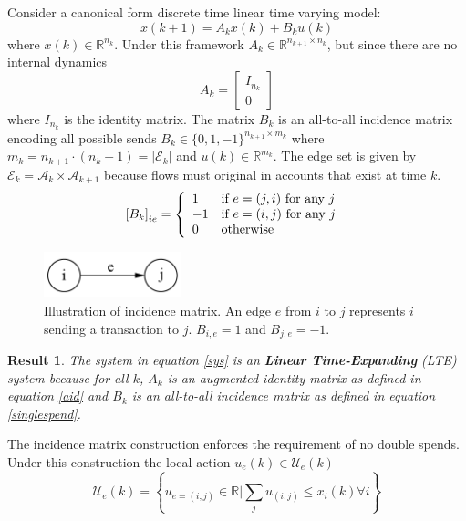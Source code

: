 \documentclass[letterpaper, 10 pt, conference]{ieeeconf}  %
\newtheorem{result}{Result}
\begin{document}
Consider a canonical form discrete time linear time varying model:
\begin{equation}
x(k+1) = A_k x(k) + B_k u(k) \label{sys}
\end{equation}
where $x(k) \in \mathbb{R}^{n_k}$.
Under this framework $A_k\in \mathbb{R}^{n_{k+1} \times n_k}$, but since there are no internal dynamics
\begin{equation}
A_k = \left[ \begin{array}{c} I_{n_k}\\ 0  \end{array} \right]\label{aid}
\end{equation}
where $ I_{n_k}$ is the identity matrix. The matrix $B_k$ is an all-to-all incidence matrix encoding all possible sends $B_k\in \{0,1,-1\}^{n_{k+1} \times m_k}$ where $m_k = n_{k+1}\cdot(n_k-1) = |\mathcal{E}_k|$ and $u(k)\in \mathbb{R}^{m_k}$. The edge set is given by $\mathcal{E}_k=\mathcal{A}_{k} \times \mathcal{A}_{k+1}$ because flows must original in accounts that exist at time $k$. 
\begin{equation}
\left[B_k\right]_{ie} = \left\{\begin{array}{ll} 1 & \hbox{if $e=(j,i)$ for any $j$ }\\ -1 & \hbox{if $e=(i,j)$ for any $j$ }\\ 0 & \hbox{otherwise}\end{array} \right. \label{singlespend}
\end{equation}
\begin{figure}[h]
\includegraphics[width=4cm]{incidence.png}
\centering
\caption{Illustration of incidence matrix. An edge $e$ from $i$ to $j$ represents $i$ sending a transaction to $j$. $B_{i, e} = 1$ and $B_{j, e} = -1$.  }
\centering
\end{figure}
\begin{result}
The system in equation \eqref{sys} is an \textbf{Linear Time-Expanding} (LTE) system because for all $k$, $A_k$ is an augmented identity matrix as defined in equation \eqref{aid} and $B_k$ is an all-to-all incidence matrix as defined in equation \eqref{singlespend}.
\end{result}
The incidence matrix construction enforces the requirement of no double spends. Under this construction the local action $u_e(k) \in \mathcal{U}_e(k)$
\begin{equation}
\mathcal{U}_e(k) = \left\{u_{e=(i,j)} \in\mathbb{R} \big | \sum_j u_{(i,j)} \le x_i(k) \forall i\right\} \label{positivebalances}
\end{equation}
\end{document}
